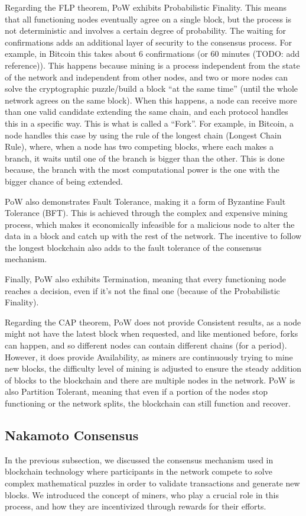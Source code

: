 Regarding the FLP theorem, PoW exhibits Probabilistic Finality. This means that all functioning nodes eventually agree on a single block, but the process is not deterministic and involves a certain degree of probability. The waiting for confirmations adds an additional layer of security to the consensus process. For example, in Bitcoin this takes about 6 confirmations (or 60 minutes (TODO: add reference)). This happens because mining is a process independent from the state of the network and independent from other nodes, and two or more nodes can solve the cryptographic puzzle/build a block ``at the same time'' (until the whole network agrees on the same block).
When this happens, a node can receive more than one valid candidate extending the same chain, and each protocol handles this in a specific way. This is what is called a ``Fork''.
For example, in Bitcoin, a node handles this case by using the rule of the longest chain (Longest Chain Rule), where, when a node has two competing blocks, where each makes a branch, it waits until one of the branch is bigger than the other.
This is done because, the branch with the most computational power is the one with the bigger chance of being extended.

PoW also demonstrates Fault Tolerance, making it a form of Byzantine Fault Tolerance (BFT). This is achieved through the complex and expensive mining process, which makes it economically infeasible for a malicious node to alter the data in a block and catch up with the rest of the network. The incentive to follow the longest blockchain also adds to the fault tolerance of the consensus mechanism.

Finally, PoW also exhibits Termination, meaning that every functioning node reaches a decision, even if it's not the final one (because of the Probabilistic Finality). 

Regarding the CAP theorem, PoW does not provide Consistent results, as a node might not have the latest block when requested, and like mentioned before, forks can happen, and so different nodes can contain different chains (for a period).
However, it does provide Availability, as miners are continuously trying to mine new blocks, the difficulty level of mining is adjusted to ensure the steady addition of blocks to the blockchain and there are multiple nodes in the network.
PoW is also Partition Tolerant, meaning that even if a portion of the nodes stop functioning or the network splits, the blockchain can still function and recover.

\subsection*{Nakamoto Consensus}
In the previous subsection, we discussed the consensus mechanism used in blockchain technology where participants in the network compete to solve complex mathematical puzzles in order to validate transactions and generate new blocks. We introduced the concept of miners, who play a crucial role in this process, and how they are incentivized through rewards for their efforts.

